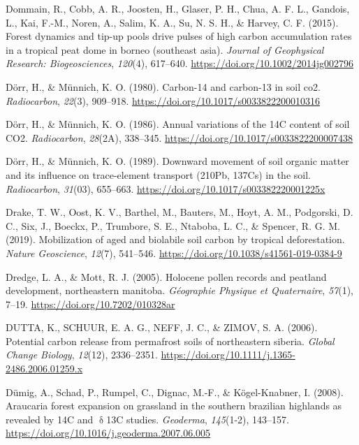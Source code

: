 \documentclass[]{article}
\begin{document}
\leavevmode\hypertarget{ref-Dommain_2015}{}%
Dommain, R., Cobb, A. R., Joosten, H., Glaser, P. H., Chua, A. F. L.,
Gandois, L., Kai, F.-M., Noren, A., Salim, K. A., Su\textquotesingleut,
N. S. H., \& Harvey, C. F. (2015). Forest dynamics and tip-up pools
drive pulses of high carbon accumulation rates in a tropical peat dome
in borneo (southeast asia). \emph{Journal of Geophysical Research:
Biogeosciences}, \emph{120}(4), 617--640.
\url{https://doi.org/10.1002/2014jg002796}

\leavevmode\hypertarget{ref-D_rr_1980}{}%
Dörr, H., \& Münnich, K. O. (1980). Carbon-14 and carbon-13 in soil co2.
\emph{Radiocarbon}, \emph{22}(3), 909--918.
\url{https://doi.org/10.1017/s0033822200010316}

\leavevmode\hypertarget{ref-D_rr_1986}{}%
Dörr, H., \& Münnich, K. O. (1986). Annual variations of the 14C content
of soil CO2. \emph{Radiocarbon}, \emph{28}(2A), 338--345.
\url{https://doi.org/10.1017/s0033822200007438}

\leavevmode\hypertarget{ref-D_rr_1989}{}%
Dörr, H., \& Münnich, K. O. (1989). Downward movement of soil organic
matter and its influence on trace-element transport (210Pb, 137Cs) in
the soil. \emph{Radiocarbon}, \emph{31}(03), 655--663.
\url{https://doi.org/10.1017/s003382220001225x}

\leavevmode\hypertarget{ref-Drake_2019}{}%
Drake, T. W., Oost, K. V., Barthel, M., Bauters, M., Hoyt, A. M.,
Podgorski, D. C., Six, J., Boeckx, P., Trumbore, S. E., Ntaboba, L. C.,
\& Spencer, R. G. M. (2019). Mobilization of aged and biolabile soil
carbon by tropical deforestation. \emph{Nature Geoscience},
\emph{12}(7), 541--546. \url{https://doi.org/10.1038/s41561-019-0384-9}

\leavevmode\hypertarget{ref-Dredge_2005}{}%
Dredge, L. A., \& Mott, R. J. (2005). Holocene pollen records and
peatland development, northeastern manitoba. \emph{Géographie Physique
et Quaternaire}, \emph{57}(1), 7--19.
\url{https://doi.org/10.7202/010328ar}

\leavevmode\hypertarget{ref-DUTTA_2006}{}%
DUTTA, K., SCHUUR, E. A. G., NEFF, J. C., \& ZIMOV, S. A. (2006).
Potential carbon release from permafrost soils of northeastern siberia.
\emph{Global Change Biology}, \emph{12}(12), 2336--2351.
\url{https://doi.org/10.1111/j.1365-2486.2006.01259.x}

\leavevmode\hypertarget{ref-D_mig_2008}{}%
Dümig, A., Schad, P., Rumpel, C., Dignac, M.-F., \& Kögel-Knabner, I.
(2008). Araucaria forest expansion on grassland in the southern
brazilian highlands as revealed by 14C and \(\updelta\)13C studies.
\emph{Geoderma}, \emph{145}(1-2), 143--157.
\url{https://doi.org/10.1016/j.geoderma.2007.06.005}
\end{document}
